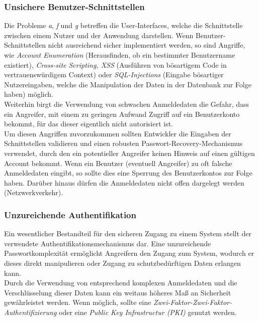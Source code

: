 \documentclass[conference]{IEEEtran}
\begin{document}
\subsubsection{Unsichere Benutzer-Schnittstellen} 
Die Probleme \textit{a}, \textit{f} und \textit{g} betreffen die User-Interfaces, welche die Schnittstelle zwischen einem Nutzer und der Anwendung darstellen. Wenn Benutzer-Schnittstellen nicht ausreichend sicher implementiert werden, so sind Angriffe, wie \textit{Account Enumeration} (Herausfinden, ob ein bestimmter Benutzername existiert), \textit{Cross-site Scripting, XSS} (Ausführen von bösartigem Code in vertrauenswürdigem Context) oder \textit{SQL-Injections} (Eingabe bösartiger Nutzereingaben, welche die Manipulation der Daten in der Datenbank zur Folge haben) möglich. \\
Weiterhin birgt die Verwendung von schwachen Anmeldedaten die Gefahr, dass ein Angreifer, mit einem zu geringen Aufwand Zugriff auf ein Benutzerkonto bekommt, für das dieser eigentlich nicht autorisiert ist.  \\ 
Um diesen Angriffen zuvorzukommen sollten Entwickler die Eingaben der Schnittstellen validieren und einen robusten Passwort-Recovery-Mechanismus verwendet, durch den ein potentieller Angreifer keinen Hinweis auf einen gültigen Account bekommt\cite{owasp}. Wenn ein Benutzer (eventuell Angreifer) zu oft falsche Anmeldedaten eingibt, so sollte dies eine Sperrung des Benutzerkontos zur Folge haben. Darüber hinaus dürfen die Anmeldedaten nicht offen dargelegt werden (Netzwerkverkehr). \\
\subsubsection{Unzureichende Authentifikation}
Ein wesentlicher Bestandteil für den sicheren Zugang zu einem System stellt der verwendete Authentifikationsmechanismus dar. Eine unzureichende Passwortkomplexität ermöglicht Angreifern den Zugang zum System, wodurch er dieses direkt manipulieren oder Zugang zu schutzbedürftigen Daten erlangen kann. \\
Durch die Verwendung von entsprechend komplexen Anmeldedaten und die Verschlüsselung dieser Daten kann ein weitaus höheres Maß an Sicherheit gewährleistet werden. Wenn möglich, sollte eine \textit{Zwei-Faktor-Zwei-Faktor-Authentifizierung} oder eine \textit{Public Key Infrastructur (PKI)} genutzt werden\cite{owasp}. \\
\end{document}
